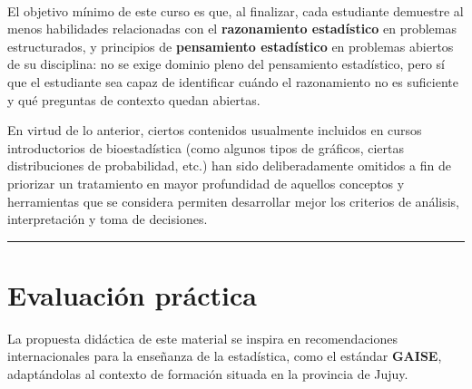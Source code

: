 \documentclass[
  spanish,
  letterpaper,
  DIV=11,
  numbers=noendperiod]{scrreprt}
\begin{document}
~

\begin{tcolorbox}[enhanced jigsaw, arc=.35mm, bottomrule=.15mm, bottomtitle=1mm, breakable, colback=white, colbacktitle=quarto-callout-note-color!10!white, colframe=quarto-callout-note-color-frame, coltitle=black, left=2mm, leftrule=.75mm, opacityback=0, opacitybacktitle=0.6, rightrule=.15mm, title=\textcolor{quarto-callout-note-color}{\faInfo}\hspace{0.5em}{Objetivo del curso (actividades prácticas)}, titlerule=0mm, toprule=.15mm, toptitle=1mm]

El objetivo mínimo de este curso es que, al finalizar, cada estudiante
demuestre al menos habilidades relacionadas con el \textbf{razonamiento
estadístico} en problemas estructurados, y principios de
\textbf{pensamiento estadístico} en problemas abiertos de su disciplina:
no se exige dominio pleno del pensamiento estadístico, pero sí que el
estudiante sea capaz de identificar cuándo el razonamiento no es
suficiente y qué preguntas de contexto quedan abiertas.

\end{tcolorbox}

En virtud de lo anterior, ciertos contenidos usualmente incluidos en
cursos introductorios de bioestadística (como algunos tipos de gráficos,
ciertas distribuciones de probabilidad, etc.) han sido deliberadamente
omitidos a fin de priorizar un tratamiento en mayor profundidad de
aquellos conceptos y herramientas que se considera permiten desarrollar
mejor los criterios de análisis, interpretación y toma de decisiones.

\begin{center}\rule{0.5\linewidth}{0.5pt}\end{center}

\section{Evaluación práctica}\label{evaluaciuxf3n-pruxe1ctica}

La propuesta didáctica de este material se inspira en recomendaciones
internacionales para la enseñanza de la estadística, como el estándar
\textbf{GAISE}, adaptándolas al contexto de formación situada en la
provincia de Jujuy.
\end{document}
